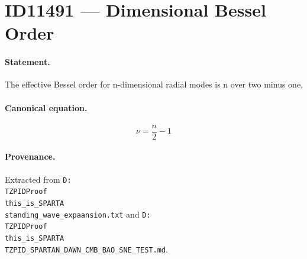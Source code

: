 \section*{ID11491 --- Dimensional Bessel Order}

\paragraph{Statement.}
The effective Bessel order for n-dimensional radial modes is n over two minus one.

\paragraph{Canonical equation.}
\[
\nu=\frac n2-1
\]

\paragraph{Provenance.}
Extracted from \texttt{D:\\TZPIDProof\\this\_is\_SPARTA\\standing\_wave\_expaansion.txt} and \texttt{D:\\TZPIDProof\\this\_is\_SPARTA\\TZPID\_SPARTAN\_DAWN\_CMB\_BAO\_SNE\_TEST.md}.
